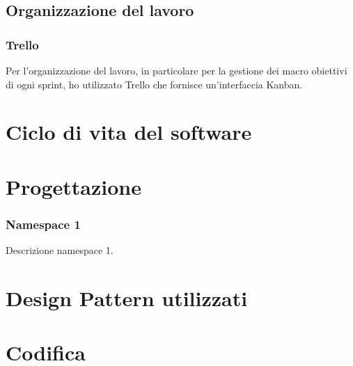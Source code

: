 \subsection{Organizzazione del lavoro}
\subsubsection*{Trello}
Per l'organizzazione del lavoro, in particolare per la gestione dei macro obiettivi di ogni sprint, ho utilizzato Trello che fornisce un'interfaccia Kanban.



\section{Ciclo di vita del software}
\label{sec:ciclo-vita-software}

\section{Progettazione}
\label{sec:progettazione}

\subsubsection{Namespace 1} %
Descrizione namespace 1.

\begin{namespacedesc}
\end{namespacedesc}


\section{Design Pattern utilizzati}

\section{Codifica}
